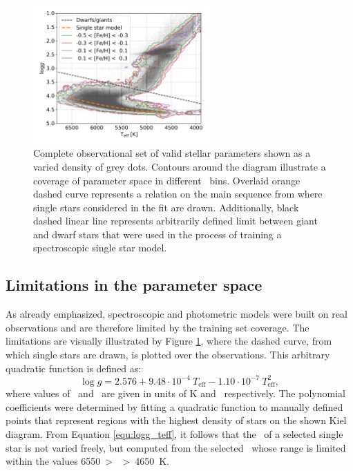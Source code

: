 \begin{figure}
	\centering
	\includegraphics[width=0.6\textwidth]{kiel_cannon_contour_iDR3.png}
	\caption{Complete observational set of valid stellar parameters shown as a varied density of grey dots. Contours around the diagram illustrate a coverage of parameter space in different \Feh\ bins. Overlaid orange dashed curve represents a relation on the main sequence from where single stars considered in the fit are drawn. Additionally, black dashed linear line represents arbitrarily defined limit between giant and dwarf stars that were used in the process of training a spectroscopic single star model.}
	\label{fig:kiel_cannon}
\end{figure}

\subsection{Limitations in the parameter space}
As already emphasized, spectroscopic and photometric models were built on real observations and are therefore limited by the training set coverage. The limitations are visually illustrated by Figure \ref{fig:kiel_cannon}, where the dashed curve, from which single stars are drawn, is plotted over the observations. This arbitrary quadratic function is defined as:
\begin{equation}
	\label{equ:logg_teff}
	\log g = 2.576 + 9.48 \cdot 10^{-4} \ T_\mathrm{eff} - 1.10 \cdot 10^{-7} \ T_\mathrm{eff}^2,
\end{equation}
where values of \Teff\ and \Logg\ are given in units of K and \cms\ respectively. The polynomial coefficients were determined by fitting a quadratic function to manually defined points that represent regions with the highest density of stars on the shown Kiel diagram. From Equation \ref{equ:logg_teff}, it follows that the \Logg\ of a selected single star is not varied freely, but computed from the selected \Teff\ whose range is limited within the values 6550~\textgreater~\Teff~\textgreater~4650~K.

